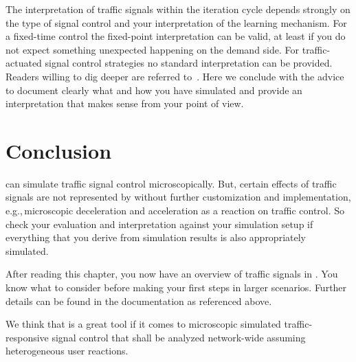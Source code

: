 The interpretation of traffic signals within the  iteration cycle depends strongly on the type of signal control and your interpretation of the learning mechanism. 
For a fixed-time control the fixed-point interpretation can be valid, at least if you do not expect something unexpected happening on the demand side. 
For traffic-actuated signal control strategies no standard interpretation can be provided. 
Readers willing to dig deeper are referred to~\citet[][pp.~75]{Grether2014PhD}.  
Here we conclude with the advice to document clearly what and how you have simulated and provide an interpretation that makes sense from your point of view.    

\section{Conclusion} 
\label{sec:signals_evaluation_conclusion}
 can simulate traffic signal control microscopically. 
But, certain effects of traffic signals are not represented by  without further customization and implementation, e.g.,\,microscopic deceleration and acceleration as a reaction on traffic control. So check your evaluation and interpretation against your simulation setup if everything that you derive from simulation results is also appropriately simulated.  

After reading this chapter, you now have an overview of traffic signals in . You know what to consider before making your first steps in larger scenarios. Further details can be found in the  documentation as referenced above. 

We think that  is a great tool if it comes to microscopic simulated traffic-responsive signal control that shall be analyzed network-wide assuming heterogeneous user reactions. 

 
